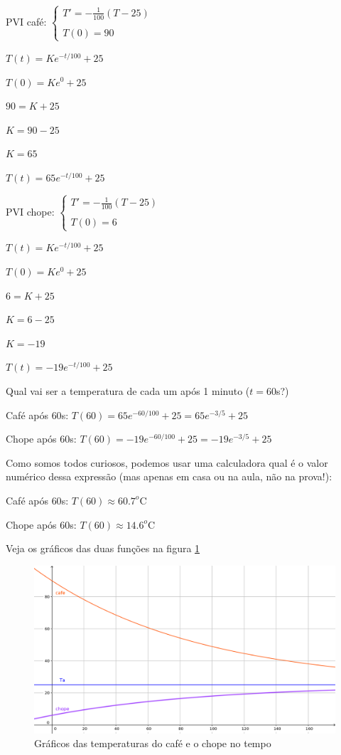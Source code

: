 \documentclass[a4paper]{article}
\begin{document}
\begin{multicols}{2}
PVI café:  $\left\{
    \begin{array}{l}
      T'=-\frac{1}{100}(T-25)\\
      \\
      T(0)=90
    \end{array}
  \right.$

$T(t)=Ke^{-t/100}+25$

$T(0)=Ke^{0}+25$

$90=K+25$

$K= 90 - 25$

$K=65$

$T(t)=65e^{-t/100}+25$

\columnbreak

PVI chope:  $\left\{
    \begin{array}{l}
      T'=-\frac{1}{100}(T-25)\\
      \\
      T(0)=6
    \end{array}
  \right.$

$T(t)=Ke^{-t/100}+25$

$T(0)=Ke^{0}+25$

$6=K+25$

$K= 6 - 25$

$K=-19$

$T(t)=-19e^{-t/100}+25$

\end{multicols}

Qual vai ser a temperatura de cada um após 1 minuto ($t=60$s?)

Café após $60$s: $T(60)=65e^{-60/100}+25 = 65e^{-3/5}+25$

Chope após $60$s: $T(60)=-19e^{-60/100}+25 = -19e^{-3/5}+25$

Como somos todos curiosos, podemos usar uma calculadora qual é o valor numérico dessa
expressão (mas apenas em casa ou na aula, não na prova!):

Café após $60$s: $T(60)\approx 60.7^o$C

Chope após $60$s: $T(60)\approx 14.6^o$C

Veja os gráficos das duas funções na figura \ref{fig:LNR}

\begin{figure}
  \centering
  \includegraphics[width=.9\textwidth]{cafe_chope}
  \caption{Gráficos das temperaturas do café e o chope no tempo}
  \label{fig:LNR}
\end{figure}
\hrulefill
\end{document}
